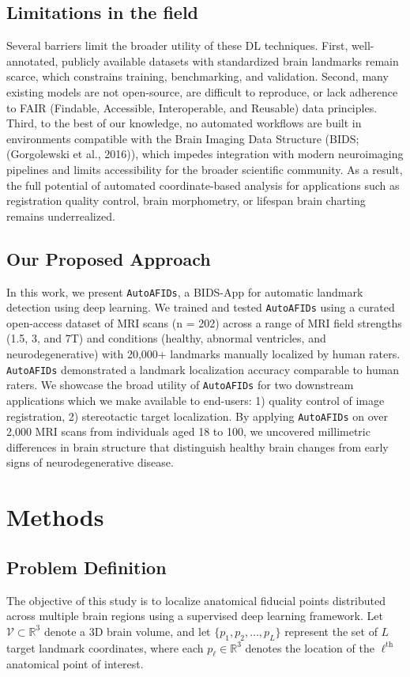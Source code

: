 \subsection{Limitations in the field}
Several barriers limit the broader utility of these DL techniques. First, well-annotated, publicly available datasets with standardized brain landmarks remain scarce, which constrains training, benchmarking, and validation. Second, many existing models are not open-source, are difficult to reproduce, or lack adherence to FAIR (Findable, Accessible, Interoperable, and Reusable) data principles. Third, to the best of our knowledge, no automated workflows are built in environments compatible with the Brain Imaging Data Structure (BIDS; (Gorgolewski et al., 2016)), which impedes integration with modern neuroimaging pipelines and limits accessibility for the broader scientific community. As a result, the full potential of automated coordinate-based analysis for applications such as registration quality control, brain morphometry, or lifespan brain charting remains underrealized.

\subsection{Our Proposed Approach}
In this work, we present \texttt{AutoAFIDs}, a BIDS-App for automatic landmark detection using deep learning. We trained and tested \texttt{AutoAFIDs} using a curated open-access dataset of MRI scans (n = 202) across a range of MRI field strengths (1.5, 3, and 7T) and conditions (healthy, abnormal ventricles, and neurodegenerative) with 20,000+ landmarks manually localized by human raters. \texttt{AutoAFIDs} demonstrated a landmark localization accuracy comparable to human raters. We showcase the broad utility of \texttt{AutoAFIDs} for two downstream applications which we make available to end-users: 1) quality control of image registration, 2) stereotactic target localization. By applying \texttt{AutoAFIDs} on over 2,000 MRI scans from individuals aged 18 to 100, we uncovered millimetric differences in brain structure that distinguish healthy brain changes from early signs of neurodegenerative disease.

\section{Methods}
\subsection{Problem Definition}
\label{sec:problemstatement}
The objective of this study is to localize anatomical fiducial points distributed across multiple brain regions using a supervised deep learning framework. Let $\mathcal{V} \subset \mathbb{R}^3$ denote a 3D brain volume, and let $\{p_1, p_2, \ldots, p_L\}$ represent the set of $L$ target landmark coordinates, where each $p_\ell \in \mathbb{R}^3$ denotes the location of the $\ell^{\text{th}}$ anatomical point of interest.

